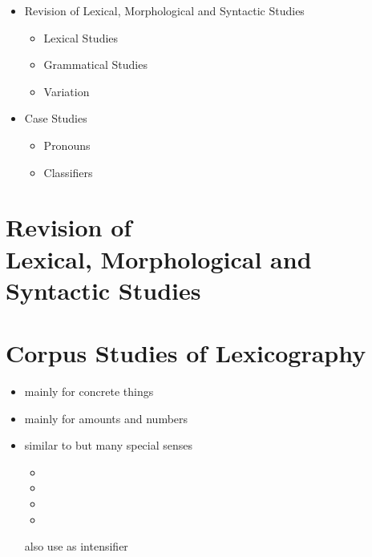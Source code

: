 \documentclass[a4paper,landscape,headrule,footrule,xetex]{foils}
\begin{document}

\maketitle



\begin{itemize} 
\item Revision of Lexical, Morphological and Syntactic Studies
  \begin{itemize} 
  \item Lexical Studies
  \item Grammatical Studies
  \item Variation
  \end{itemize}
\item Case Studies
  \begin{itemize}
  \item Pronouns
  \item Classifiers
  \end{itemize}
\end{itemize}


\section{Revision of \\
Lexical, Morphological and Syntactic Studies}

\section{Corpus Studies of Lexicography}

\begin{itemize}
\item {}  mainly for concrete things
\item {}  mainly for amounts and numbers
\item {} similar to  but many special senses
  \begin{itemize}
  \item {}  
  \item {}  
  \item {}
  \item {} 
  \end{itemize}
also use as intensifier 
\end{itemize}
\end{document}
